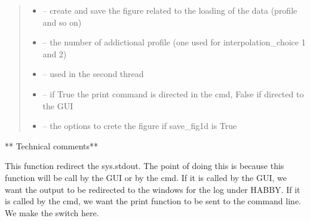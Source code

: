 \documentclass[letterpaper,10pt,english]{sphinxmanual}
\begin{document}
\begin{fulllineitems}
\begin{quote}
\begin{description}
\begin{itemize}
\item {} 
 -- create and save the figure related to the loading of the data (profile and so on)

\item {} 
 -- the number of addictional profile (one used for interpolation\_choice 1 and 2)

\item {} 
 -- used in the second thread

\item {} 
 -- if True the print command is directed in the cmd, False if directed to the GUI

\item {} 
 -- the options to crete the figure if save\_fig1d is True

\end{itemize}

\end{description}\end{quote}

** Technical comments**

This function redirect the sys.stdout. The point of doing this is because this function will be call by the GUI or
by the cmd. If it is called by the GUI, we want the output to be redirected to the windows for the log under HABBY.
If it is called by the cmd, we want the print function to be sent to the command line. We make the switch here.

\end{fulllineitems}

\end{document}

